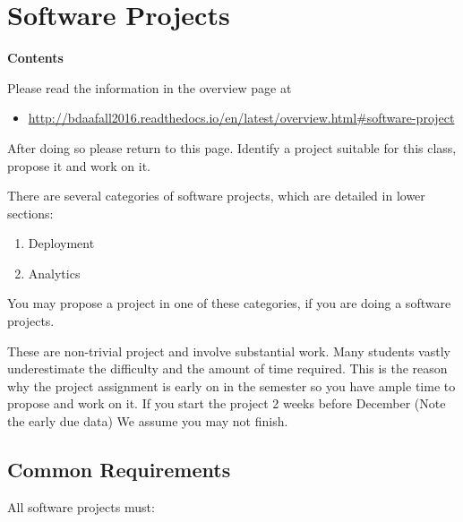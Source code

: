 \section{Software Projects}\label{software-projects}

\textbf{Contents}

Please read the information in the overview page at

\begin{itemize}
\tightlist
\item
  \url{http://bdaafall2016.readthedocs.io/en/latest/overview.html\#software-project}
\end{itemize}

After doing so please return to this page. Identify a project suitable
for this class, propose it and work on it.

There are several categories of software projects, which are detailed in
lower sections:

\begin{enumerate}
\tightlist
\item
  Deployment
\item
  Analytics
\end{enumerate}

You may propose a project in one of these categories, if you are doing a
software projects.

These are non-trivial project and involve substantial work. Many
students vastly underestimate the difficulty and the amount of time
required. This is the reason why the project assignment is early on in
the semester so you have ample time to propose and work on it. If you
start the project 2 weeks before December (Note the early due data) We
assume you may not finish.

\subsection{Common Requirements}\label{common-requirements}

All software projects must:

